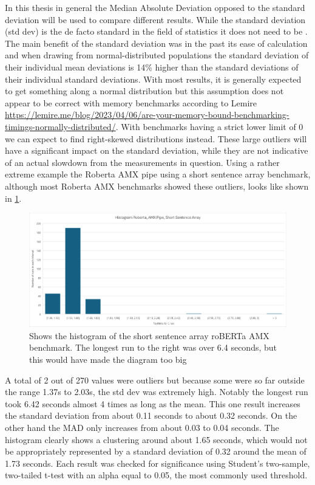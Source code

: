 In this thesis in general the Median Absolute Deviation opposed to the standard deviation will be used to compare different results. While the standard deviation (std dev) is the de facto standard in the field of statistics it does not need to be \cite{gorard_revisiting_2005}. The main benefit of the standard deviation was in the past its ease of calculation and when drawing from normal-distributed populations \guillemotright the standard deviation of their individual mean deviations is 14\% higher than the standard deviations of their individual standard deviations. \guillemotleft \cite{gorard_revisiting_2005}
With most results, it is generally expected to get something along a normal distribution but this assumption does not appear to be correct with memory benchmarks according to Lemire \url{https://lemire.me/blog/2023/04/06/are-your-memory-bound-benchmarking-timings-normally-distributed/}. With benchmarks having a strict lower limit of 0 we can expect to find right-skewed distributions instead. These large outliers will have a significant impact on the standard deviation, while they are not indicative of an actual slowdown from the measurements in question. Using a rather extreme example the Roberta AMX pipe using a short sentence array benchmark, although most Roberta AMX benchmarks showed these outliers, looks like shown in \cref{fig:histogramm}.
\begin{figure}
\centering
\includegraphics[width=\textwidth]{figures/Histogramm.png}
\caption{Shows the histogram of the short sentence array roBERTa AMX benchmark. The longest run to the right was over 6.4 seconds, but this would have made the diagram too big}
\label{fig:histogramm}
\end{figure}
A total of 2 out of 270 values were outliers but because some were so far outside the range 1.37s to 2.03s, the std dev was extremely high. Notably the longest run took 6.42 seconds almost 4 times as long as the mean. This one result increases the standard deviation from about 0.11 seconds to about 0.32 seconds. On the other hand the MAD only increases from about 0.03 to 0.04 seconds. The histogram clearly shows a clustering around about  1.65 seconds, which would not be appropriately represented by a standard deviation of 0.32 around the mean of 1.73 seconds. Each result was checked for significance using Student’s two-sample, two-tailed t-test with an alpha equal to 0.05, the most commonly used threshold. 

